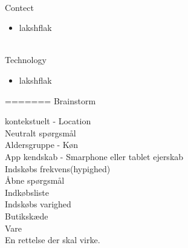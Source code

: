 \documentclass[12pt]{article}
\begin{document}
\\

Contect
\begin{itemize}
\item lakshflak
\end{itemize}

\\

Technology
\begin{itemize}
\item lakshflak
\end{itemize}
   

=======
 Brainstorm

  kontekstuelt - Location \\

  Neutralt sp\o rgsm\aa l \\

  Aldersgruppe - K\o n \\

  App kendskab - Smarphone eller tablet ejerskab \\ 

  Indsk\o bs frekvens(hypighed) \\

  \AA bne sp\o rgsm\aa l \\ 

  Indk\o bsliste \\
  
  Indsk\o bs varighed \\
  
  Butiksk\ae de \\

  Vare \\
 
 En rettelse der skal virke.   
\end{document}
